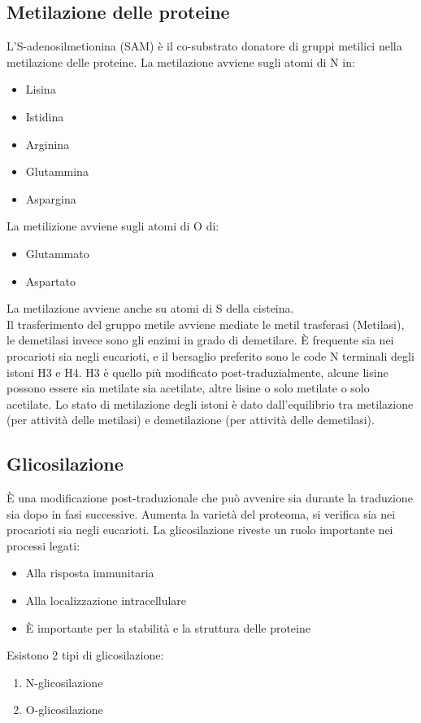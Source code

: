 \documentclass{article}
\begin{document}
\subsection{Metilazione delle proteine}
L'S-adenosilmetionina (SAM) è il co-substrato donatore di gruppi metilici nella metilazione delle proteine.
La metilazione avviene sugli atomi di N in:
\begin{itemize}
    \item Lisina 
    \item Istidina
    \item Arginina
    \item Glutammina
    \item Aspargina
\end{itemize}
La metilizione avviene sugli atomi di O di:
\begin{itemize}
    \item Glutammato
    \item Aspartato
\end{itemize}
La metilazione avviene anche su atomi di S della cisteina.\\
Il trasferimento del gruppo metile avviene mediate le metil trasferasi (Metilasi), le demetilasi invece sono gli enzimi in grado di demetilare. È frequente sia nei procarioti sia negli eucarioti, e il bersaglio 
preferito sono le code N terminali degli istoni H3 e H4. H3 è quello più modificato post-traduzialmente, alcune lisine possono essere sia
metilate sia acetilate, altre lisine o solo metilate o solo acetilate. Lo stato di metilazione degli istoni è dato
dall'equilibrio tra metilazione (per attività delle metilasi) e demetilazione (per attività delle demetilasi). 
\subsection{Glicosilazione}
È una modificazione post-traduzionale che può avvenire sia durante la traduzione sia
dopo in fasi successive. Aumenta la varietà del proteoma, si verifica sia nei procarioti sia negli eucarioti. La glicosilazione riveste un ruolo importante nei processi legati:
\begin{itemize}
    \item Alla risposta immunitaria
    \item Alla localizzazione intracellulare
    \item È importante per la stabilità e la struttura delle proteine
\end{itemize}
Esistono 2 tipi di glicosilazione:
\begin{enumerate}
    \item N-glicosilazione
    \item O-glicosilazione
\end{enumerate}
\end{document}
